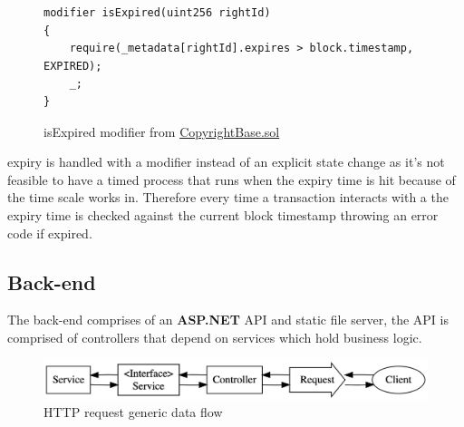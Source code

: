 \begin{figure}[H]
\caption{isExpired modifier from \href{https://github.com/MrHarrisonBarker/CRPL/blob/main/CRPL.Contracts/contracts/Copyrights/CopyrightBase.sol}{CopyrightBase.sol}}
\centering
\begin{lstlisting}[language=Solidity]
modifier isExpired(uint256 rightId)
{
	require(_metadata[rightId].expires > block.timestamp, EXPIRED);
	_;
}
\end{lstlisting}
\end{figure}

 expiry is handled with a modifier instead of an explicit state change as it's not feasible to have a timed process that runs when the expiry time is hit because of the time scale  works in. Therefore every time a transaction interacts with a  the expiry time is checked against the current block timestamp throwing an error code if expired.

\subsection{Back-end}

The back-end comprises of an \textbf{ASP.NET} API and static file server, the API is comprised of controllers that depend on services which hold business logic.

\begin{figure}[H]
\caption{HTTP request generic data flow}
\centering
\includegraphics[width=\textwidth,height=\textheight,keepaspectratio]{images/patterns/service-controller}
\end{figure}

